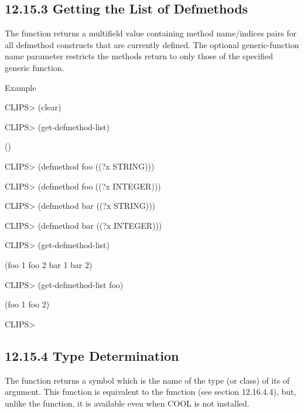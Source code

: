 \documentclass[letterpaper,10pt,english]{sphinxmanual}
\begin{document}

\begin{sphinxVerbatim}[commandchars=\\\{\}]
 
\end{sphinxVerbatim}


\subsection{12.15.3 Getting the List of Defmethods}
\label{\detokenize{actions:getting-the-list-of-defmethods}}
The function  returns a multifield value
containing method name/indices pairs for all defmethod constructs that
are currently defined. The optional generic-function name parameter
restricts the methods return to only those of the specified generic
function.


\begin{sphinxVerbatim}[commandchars=\\\{\}]
 \PYG{p}{[}\PYG{p}{]}
\end{sphinxVerbatim}

Example

CLIPS\textgreater{} (clear)

CLIPS\textgreater{} (get-defmethod-list)

()

CLIPS\textgreater{} (defmethod foo ((?x STRING)))

CLIPS\textgreater{} (defmethod foo ((?x INTEGER)))

CLIPS\textgreater{} (defmethod bar ((?x STRING)))

CLIPS\textgreater{} (defmethod bar ((?x INTEGER)))

CLIPS\textgreater{} (get-defmethod-list)

(foo 1 foo 2 bar 1 bar 2)

CLIPS\textgreater{} (get-defmethod-list foo)

(foo 1 foo 2)

CLIPS\textgreater{}


\subsection{12.15.4 Type Determination}
\label{\detokenize{actions:type-determination}}
The function  returns a symbol which is the name of the type (or
class) of its of argument. This function is equivalent to the 
function (see section 12.16.4.4), but, unlike the  function, it
is available even when COOL is not installed.
\end{document}
